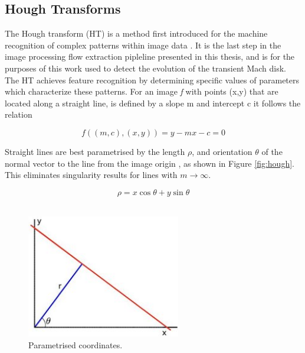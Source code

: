


\subsection{Hough Transforms}
The Hough transform (HT) is a method first introduced for the machine recognition of complex patterns within image data \citep{hough1962method}. It is the last step in the image processing flow extraction pipleline presented in this thesis, and is for the purposes of this work used to detect the evolution of the transient Mach disk. The HT achieves feature recognition by determining specific values of parameters which characterize these patterns. For an image \textit{f} with points (x,y) that are located along a straight line, is defined by a slope m and intercept c it follows the relation 

\begin{equation}
f((m,c),(x,y))=y-mx-c=0
\end{equation}

Straight lines are best parametrised by the length $\rho$, and orientation $\theta$ of the normal vector to the line from the image origin \citep{duda1971use}, as shown in Figure \ref{fig:hough}. This eliminates singularity results for lines with $m\to\infty$.

\begin{equation} \label{eqn:para}
\rho = x \cos \theta + y \sin \theta
\end{equation}\\

\begin{figure}[H] 
	\centering
	\includegraphics[width=0.6\textwidth]{hough.png} 
	\caption{Parametrised coordinates.}
	\label{fig:hough_para}
\end{figure}

